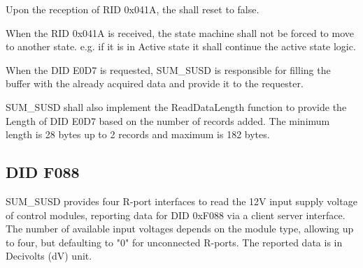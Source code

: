 {Upon the reception of RID 0x041A, the  shall reset to false.}
{ }

{When the RID 0x041A is received, the state machine shall not be forced to move to another state. e.g. if it is in Active state it shall continue the active state logic.}
{}

{When the DID E0D7 is requested, SUM_SUSD is responsible for filling the buffer with the already acquired data and provide it to the requester.}
{}

{SUM_SUSD shall also implement the ReadDataLength function to provide the Length of DID E0D7 based on the number of records added. The minimum length is 28 bytes up to 2 records and maximum is 182 bytes.}
{}


\subsection{DID F088}

SUM_SUSD provides four R-port interfaces to read the 12V input supply voltage of control modules, reporting data for DID 0xF088 via a client server interface.
The number of available input voltages depends on the module type, allowing up to four, but defaulting to "0" for unconnected R-ports. 
The reported data is in Decivolts (dV) unit.
{ }
